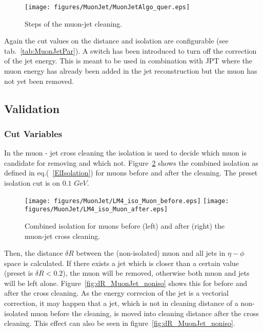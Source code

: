 \documentclass{cmspaper}
\begin{document}
\begin{figure}[hbt]
\begin{center}
\texttt{[image: figures/MuonJet/MuonJetAlgo\_quer.eps]}
\caption{Steps of the muon-jet cleaning.}
\label{fig:MJCleaning}
\end{center}
\end{figure}

Again the cut values on the distance and isolation are configurable (see
tab.~\ref{tab:MuonJetPar}). A switch has been introduced to turn off the
correction of the jet energy. This is meant to be used in combination with JPT
where the muon energy has already been added in the jet reconstruction but the
muon has not yet been removed.

\subsection{Validation}
\subsubsection{Cut Variables}
In the muon - jet cross cleaning the isolation is used to decide which muon is
candidate for removing and which not. Figure~\ref{fig:MuonIsolation} shows the
combined isolation as defined in eq.(~\ref{ElIsolation}) for muons before and
after the cleaning. The preset isolation cut is on \(0.1\) \(G\)e\(V\). 

\begin{figure}[hb]
\begin{center}
    \texttt{[image: figures/MuonJet/LM4\_iso\_Muon\_before.eps]}
    \texttt{[image: figures/MuonJet/LM4\_iso\_Muon\_after.eps]}
    \caption{Combined isolation for muons before (left) and after (right) the
    muon-jet cross cleaning.}
\label{fig:MuonIsolation}
\end{center}
\end{figure}


Then, the distance \(\delta R\) between the (non-isolated) muon and all jets in
\(\eta - \phi\) space is calculated. If there exists a jet which is closer than
a certain value (preset is \(\delta R < 0.2\)), the muon will be removed,
otherwise both muon and jets will be left alone.
Figure~\ref{fig:dR_MuonJet_noniso} shows this for before and after the cross
cleaning. As the energy correcion of the jet is a vectorial correction, it may
happen that a jet, which is not in cleaning distance of a non-isolated muon
before the cleaning, is moved into cleaning distance after the cross cleaning.
This effect can also be seen in figure~\ref{fig:dR_MuonJet_noniso}.
\end{document}
